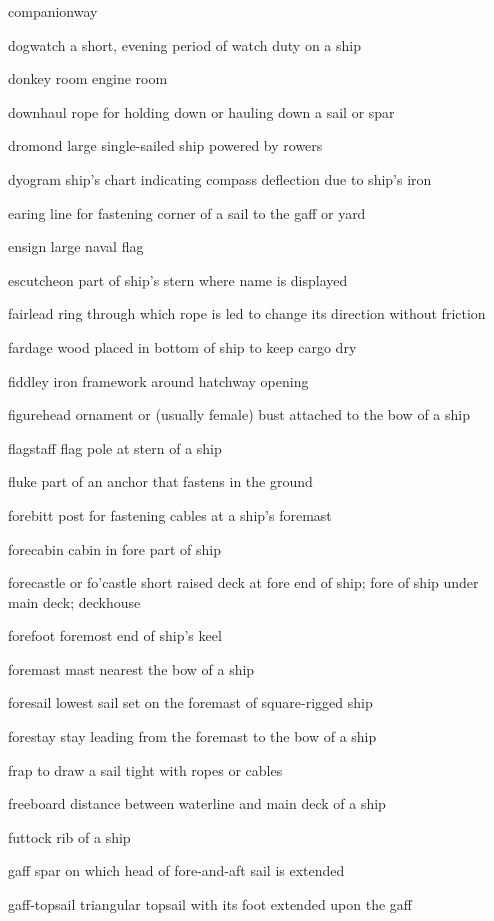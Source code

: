 \documentclass[
  11pt,
  msmallroyalvopaper
]{memoir}
\begin{document}
\begin{labeling}{companionway}
\item[dogwatch]
a short, evening period of watch duty on a ship
\item[donkey room]
engine room
\item[downhaul]
rope for holding down or hauling down a sail or spar
\item[dromond]
large single-sailed ship powered by rowers
\item[dyogram]
ship's chart indicating compass deflection due to ship's iron
\item[earing]
line for fastening corner of a sail to the gaff or yard
\item[ensign]
large naval flag
\item[escutcheon]
part of ship's stern where name is displayed
\item[fairlead]
ring through which rope is led to change its direction without friction
\item[fardage]
wood placed in bottom of ship to keep cargo dry
\item[fiddley]
iron framework around hatchway opening
\item[figurehead]
ornament or (usually female) bust attached to the bow of a ship
\item[flagstaff]
flag pole at stern of a ship
\item[fluke]
part of an anchor that fastens in the ground
\item[forebitt]
post for fastening cables at a ship's foremast
\item[forecabin]
cabin in fore part of ship
\item[forecastle or fo'castle]
short raised deck at fore end of ship; fore of ship under main deck; deckhouse
\item[forefoot]
foremost end of ship's keel
\item[foremast]
mast nearest the bow of a ship
\item[foresail]
lowest sail set on the foremast of square-rigged ship
\item[forestay]
stay leading from the foremast to the bow of a ship
\item[frap]
to draw a sail tight with ropes or cables
\item[freeboard]
distance between waterline and main deck of a ship
\item[futtock]
rib of a ship
\item[gaff]
spar on which head of fore-and-aft sail is extended
\item[gaff-topsail]
triangular topsail with its foot extended upon the gaff

\end{labeling}
\end{document}
